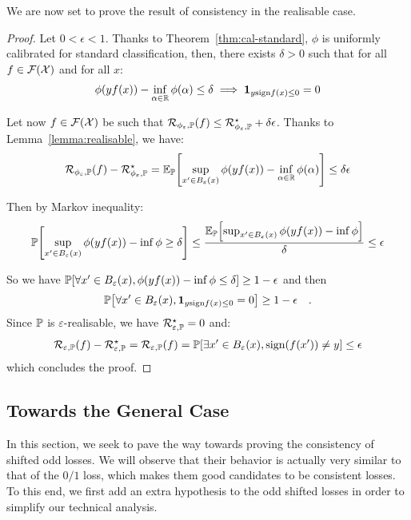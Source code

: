 We are now set to prove the result of consistency in the realisable case.
\begin{proof}
Let $0<\epsilon<1$. Thanks to Theorem~\ref{thm:cal-standard}, $\phi$ is uniformly calibrated for standard classification, then, there exists $\delta>0$ such that for all $f\in\mathcal{F}(\mathcal{X})$ and for all $x$:
\begin{align*}
    \phi(yf(x))-\inf_{\alpha\in\mathbb{R}}\phi(\alpha)\leq \delta \implies \mathbf{1}_{y\text{sign}f(x)\leq 0} = 0
\end{align*}

Let now $f\in\mathcal{F}(\mathcal{X})$ be such that  $\mathcal{R}_{\phi_\varepsilon,\mathbb{P}}(f)\leq \mathcal{R}_{\phi_\varepsilon,\mathbb{P}}^\star+\delta\epsilon$. Thanks to Lemma~\ref{lemma:realisable},  we have:
\begin{align*}
\risk_{\phi_\varepsilon,\PP}(f)- \risk_{\phi_\varepsilon,\PP}^\star = \EE_{\PP}\left[\sup_{x'\in B_\varepsilon(x)}\phi(yf(x))-\inf_{\alpha \in \RR} \phi(\alpha)\right]\leq\delta\epsilon
\end{align*}

Then by Markov inequality:
\begin{align*}
    \PP\left[\sup_{x'\in B_\varepsilon(x)}\phi(yf(x))-\inf \phi\geq\delta\right]\leq\frac{\EE_{\PP}\left[\sup_{x'\in B_\varepsilon(x)}\phi(yf(x))-\inf \phi\right]}{\delta}\leq \epsilon
\end{align*}

So we have $\PP\left[\forall x'\in B_\varepsilon(x),\phi(yf(x))-\inf \phi\leq\delta\right]\geq1-\epsilon$ and then 
\begin{align*}
    \PP\left[\forall x'\in B_\varepsilon(x),\mathbf{1}_{y\text{sign}f(x)\leq 0} = 0\right]\geq1-\epsilon\quad.
\end{align*}
 Since $\mathbb{P}$ is $\varepsilon$-realisable, we have $\mathcal{R}_{\varepsilon,\mathbb{P}}^\star=0$ and:
\begin{align*}
        \risk_{\varepsilon,\PP}(f)- \risk_{\varepsilon,\PP}^\star =  \risk_{\varepsilon,\PP}(f) =\PP\left[\exists x'\in B_\varepsilon(x), \text{sign}(f(x'))\neq y\right]\leq \epsilon
\end{align*}
which concludes the proof.
\end{proof}



\subsection{Towards the General Case}
\label{sec:consis-gen}
In this section, we seek to pave the way towards proving the consistency of shifted odd losses. We will observe that their behavior is actually very similar to that of the $0/1$ loss, which makes them good candidates to be consistent losses. To this end, we first add an extra hypothesis to the odd shifted losses in order to simplify our technical analysis.


